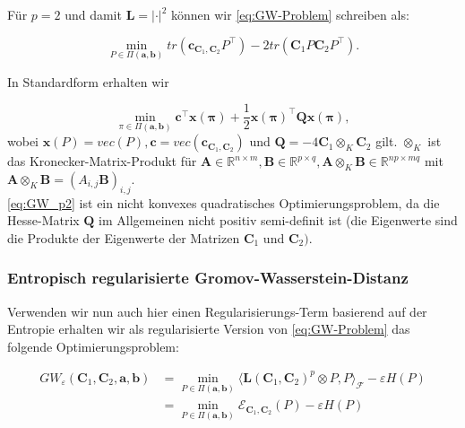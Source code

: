 \documentclass[twoside, 12pt,a4paper]{book}
\numberwithin{equation}{section}
\begin{document}
\noindent Für $p=2$ und damit $\boldsymbol{L}=|\cdot|^2$ können wir \eqref{eq:GW-Problem} schreiben als:
	
	\begin{equation}
	\min_{P \in \Pi(\boldsymbol{a}, \boldsymbol{b})}{tr(\boldsymbol{c}_{\boldsymbol{C}_1,  \boldsymbol{C}_2}P^\top) - 2 tr(\boldsymbol{C}_1P\boldsymbol{C}_2P^\top)}.
	\end{equation}
	
	\noindent In Standardform erhalten wir
	
	\begin{equation}
	\min_{\pi \in \Pi(\boldsymbol{a}, \boldsymbol{b})}{\boldsymbol{c}^\top \boldsymbol{x}(\boldsymbol{\pi}) + \frac{1}{2}\boldsymbol{x}(\boldsymbol{\pi})^\top \boldsymbol{Q}\boldsymbol{x}(\boldsymbol{\pi})},	 \label{eq:GW_p2}		
	\end{equation}
	wobei $\boldsymbol{x}(P) = vec(P), \boldsymbol{c}= vec(\boldsymbol{c}_{\boldsymbol{C}_1, \boldsymbol{C}_2})$ und $\boldsymbol{Q} = -4 \boldsymbol{C}_1 \otimes_K \boldsymbol{C}_2$ gilt. $\otimes_K$ ist das Kronecker-Matrix-Produkt für $\boldsymbol{A} \in \mathbb{R}^{n\times m}, \boldsymbol{B} \in \mathbb{R}^{p\times q}, \boldsymbol{A}\otimes_K \boldsymbol{B} \in \mathbb{R}^{np \times mq}$ mit $\boldsymbol{A} \otimes_K \boldsymbol{B} = (A_{i,j}\boldsymbol{B})_{i,j}$. \\
	
	\noindent \eqref{eq:GW_p2} ist ein nicht konvexes quadratisches Optimierungsproblem, da die Hesse-Matrix $\boldsymbol{Q}$ im Allgemeinen nicht positiv semi-definit ist (die Eigenwerte sind die Produkte der Eigenwerte der Matrizen $\boldsymbol{C}_1$ und $\boldsymbol{C}_2)$.\\
	
	
	\subsubsection{Entropisch regularisierte Gromov-Wasserstein-Distanz} \label{chapter:GW_regularized}
	
	\noindent Verwenden wir nun auch hier einen Regularisierungs-Term basierend auf der Entropie erhalten wir als regularisierte Version von \eqref{eq:GW-Problem} das folgende Optimierungsproblem:
	
	\begin{align}
	GW_{\varepsilon}(\boldsymbol{C}_1,\boldsymbol{C}_2,\boldsymbol{a},\boldsymbol{b}) &= \min_{P \in \Pi (\boldsymbol{a} , \boldsymbol{b})}{\langle \boldsymbol{L}(\boldsymbol{C}_1, \boldsymbol{C}_2)^p \otimes P, P \rangle_\mathcal{F} - \varepsilon H(P)}\\ \label{eq:GWprob_regularised2}
	&= \min_{P \in \Pi (\boldsymbol{a} , \boldsymbol{b})} \boldsymbol{\mathcal{E}}_{\boldsymbol{C}_1, \boldsymbol{C}_2}(P) -\varepsilon H(P)
	\end{align}
	
\end{document}
